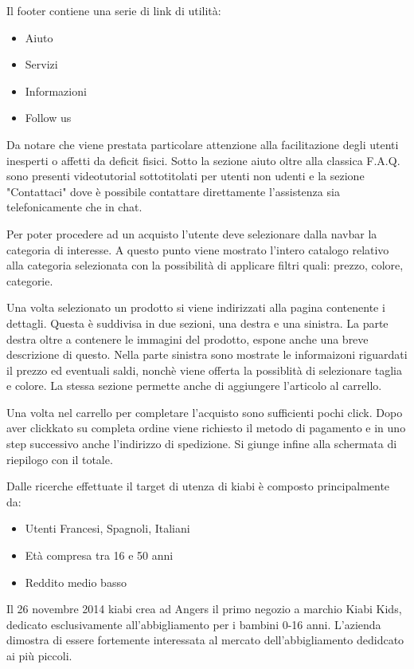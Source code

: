 \documentclass[12pt,italian,]{report}
\begin{document}
Il footer contiene una serie di link di utilità:

\begin{itemize}
\item Aiuto
\item Servizi
\item Informazioni
\item Follow us
\end{itemize}

Da notare che viene prestata particolare attenzione alla facilitazione degli utenti inesperti o affetti da deficit fisici. Sotto la sezione aiuto oltre alla classica F.A.Q. sono presenti videotutorial sottotitolati per utenti non udenti e la sezione "Contattaci" dove è possibile contattare direttamente l'assistenza sia telefonicamente che in chat.

Per poter procedere ad un acquisto l'utente deve selezionare dalla navbar la categoria di interesse.
A questo punto viene mostrato l'intero catalogo relativo alla categoria selezionata con la possibilità di applicare filtri quali: prezzo, colore, categorie.

Una volta selezionato un prodotto si viene indirizzati alla pagina contenente i dettagli. Questa è suddivisa in due sezioni, una destra e una sinistra.
La parte destra oltre a contenere le immagini del prodotto, espone anche una breve descrizione di questo. 
Nella parte sinistra sono mostrate le informaizoni riguardati il prezzo ed eventuali saldi, nonchè viene offerta la possiblità di selezionare taglia e colore. La stessa sezione permette anche di aggiungere l'articolo al carrello.

Una volta nel carrello per completare l'acquisto sono sufficienti pochi click. Dopo aver clickkato su completa ordine viene richiesto il metodo di pagamento e in uno step successivo anche l'indirizzo di spedizione. Si giunge infine alla schermata di riepilogo con il totale.


Dalle ricerche effettuate il target di utenza di kiabi è composto principalmente da:
\begin{itemize}
    \item Utenti Francesi, Spagnoli, Italiani
    \item Età compresa tra 16 e 50 anni
    \item Reddito medio basso
\end{itemize}

Il 26 novembre 2014 kiabi crea ad Angers il primo negozio a marchio Kiabi Kids, dedicato esclusivamente all'abbigliamento per i bambini 0-16 anni. L'azienda dimostra di essere fortemente interessata al mercato dell'abbigliamento dedidcato ai più piccoli.
\end{document}
